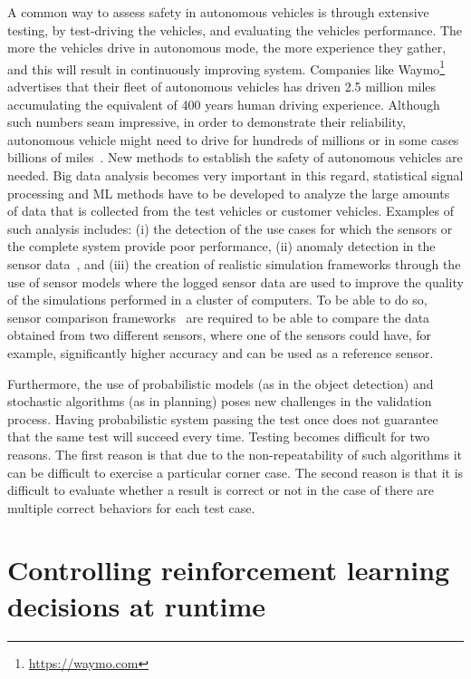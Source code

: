 \documentclass[sigconf,review, anonymous]{acmart}
\begin{document}
A common way to assess safety in autonomous vehicles is through extensive testing, by test-driving the vehicles, and evaluating the vehicles performance. The more the vehicles drive in autonomous mode, the more experience they gather, and this will result in %
continuously improving system.
Companies like Waymo\footnote{\url{https://waymo.com}} advertises that their fleet of autonomous vehicles has driven 2.5 million miles accumulating the equivalent of 400 years human driving experience. Although such numbers seam impressive, in order to demonstrate their reliability, autonomous vehicle might need to drive for hundreds of millions or in some cases billions of miles~\cite{Kalra:2016em}. New methods to establish the safety of autonomous vehicles are needed. Big data analysis becomes very important in this regard, statistical signal processing and ML methods have to be developed to analyze the large amounts of data that is collected from the test vehicles or customer vehicles. Examples of such analysis includes: (i) the detection of the use cases for which the sensors or the complete system provide poor performance, (ii) anomaly detection in the sensor data~\cite{Tashvir2017}, and (iii) the creation of realistic simulation frameworks through the use of sensor models where the logged sensor data are used to improve the quality of the %
simulations performed in a cluster of computers. To be able to do so, sensor comparison frameworks~\cite{Florbaeck2016} are required to be able to compare the data obtained from two different sensors, where one of the sensors could have,  for example, significantly higher accuracy and can be used as a reference sensor.

Furthermore, the use of probabilistic models (as in the object detection) and stochastic algorithms (as in planning) poses new challenges in the validation process.  Having %
probabilistic system passing the test once does not guarantee that the same test will succeed every time. Testing becomes difficult for two reasons. The first reason is that due to the non-repeatability of such algorithms it can be difficult to exercise a particular corner case. The second reason is that it is difficult to evaluate whether a result is correct or not in the case of there are multiple correct behaviors for each test case.

\section{Controlling reinforcement learning decisions at runtime}
\end{document}
